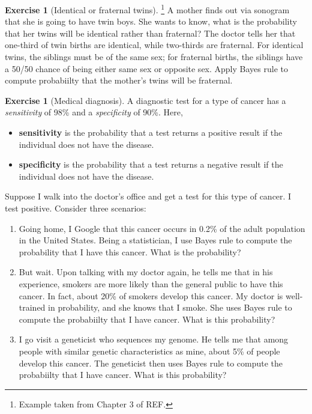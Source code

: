 \documentclass[11pt]{article}
\theoremstyle{definition}
\newtheorem{exercise}[]{Exercise}
\begin{document}
\begin{exercise}[Identical or fraternal twins]\footnote{
  Example taken from Chapter 3 of REF.
  }
  A mother finds out via sonogram that she is going to have twin boys.
  She wants to know, what is the probability that her twins will be
  identical rather than fraternal? The doctor tells her that one-third of twin births
  are identical, while two-thirds are fraternal.
  For identical twins, the siblings must be of the same sex; for fraternal births,
  the siblings have a 50/50 chance of being either same sex or opposite sex.
  Apply Bayes rule to compute probabiilty that the mother's twins will be fraternal.
\end{exercise}

\begin{exercise}[Medical diagnosis]
  A diagnostic test for a type of cancer has a \textit{sensitivity} of 98\% and a
  \textit{specificity} of 90\%. Here,
  \begin{itemize}
    \item \textbf{sensitivity} is the probability that a test returns a positive result if the
individual does not have the disease.
    \item \textbf{specificity} is the probability that a test returns a negative result if the
individual does not have the disease.
  \end{itemize}

  Suppose I walk into the doctor's office and get a test for this type of cancer.
  I test positive. Consider three scenarios:
  \begin{enumerate}[label = (\alph*)]
    \item Going home, I Google that this cancer occurs in 0.2\% of the
    adult population in the United States.
    Being a statistician, I use Bayes rule to compute the probability that I have
    this cancer. What is the probability?
    \item But wait. Upon talking with my doctor again, he tells me that in his experience,
    smokers are more likely than the general public to have this cancer.
    In fact, about 20\% of smokers develop this cancer. My doctor is well-trained in
    probability, and she knows that I smoke.
    She uses Bayes rule to compute the probabiilty that I have cancer. What is
    this probability?
    \item I go visit a geneticist who sequences my genome.
    He tells me that among people with similar genetic characteristics as mine,
    about 5\% of people develop this cancer.
    The geneticist then uses Bayes rule to compute the probabiilty that
    I have cancer. What is this probability?
  \end{enumerate}
\end{exercise}
\end{document}
